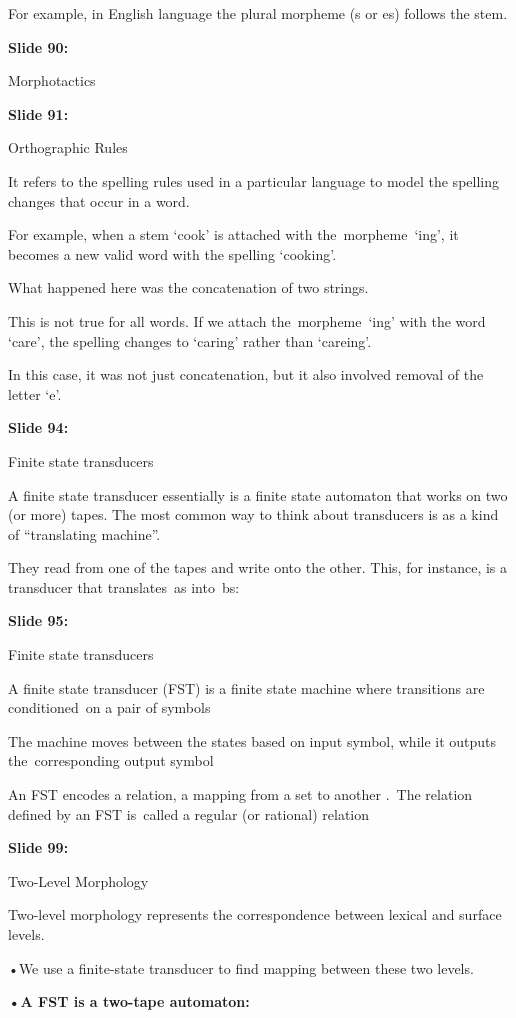 \documentclass[11pt,a4paper]{article}
\begin{document}
For example, in English language the plural morpheme (s or es) follows the stem.

\textbf{Slide 90:}

Morphotactics

\textbf{Slide 91:}

Orthographic Rules

It refers to the spelling rules used in a particular language to model the spelling changes that occur in a word.

For example, when a stem ‘cook’ is attached with the morpheme ‘ing’, it becomes a new valid word with the spelling ‘cooking’.

What happened here was the concatenation of two strings.

This is not true for all words. If we attach the morpheme ‘ing’ with the word ‘care’, the spelling changes to ‘caring’ rather than ‘careing’.

In this case, it was not just concatenation, but it also involved removal of the letter ‘e’.

\textbf{Slide 94:}

Finite state transducers

A finite state transducer essentially is a finite state automaton that works on two (or more) tapes. The most common way to think about transducers is as a kind of ``translating machine''.

They read from one of the tapes and write onto the other. This, for instance, is a transducer that translates as into bs:

\textbf{Slide 95:}

Finite state transducers

A finite state transducer (FST) is a finite state machine where transitions are conditioned on a pair of symbols

The machine moves between the states based on input symbol, while it outputs the corresponding output symbol

An FST encodes a relation, a mapping from a set to another . The relation defined by an FST is called a regular (or rational) relation

\textbf{Slide 99:}

Two-Level Morphology

Two-level morphology represents the correspondence between lexical and surface levels.

•We use a finite-state transducer to find mapping between these two levels.

\textbf{•A FST is a two-tape automaton:} 
\end{document}
